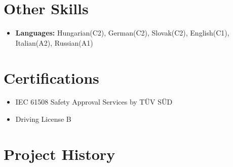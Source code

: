 \documentclass[letterpaper,11pt]{article}
\begin{document}
\section{\bf Other Skills}
\begin{itemize}
\item \textbf{Languages:} Hungarian(C2), German(C2), Slovak(C2), English(C1), Italian(A2), Russian(A1)
\end{itemize}

\section{\bf Certifications}
\begin{itemize}
\item IEC 61508 Safety Approval Services by TÜV SÜD
\item Driving License B
\end{itemize}
\clearpage

\section{\bf Project History}
\end{document}
